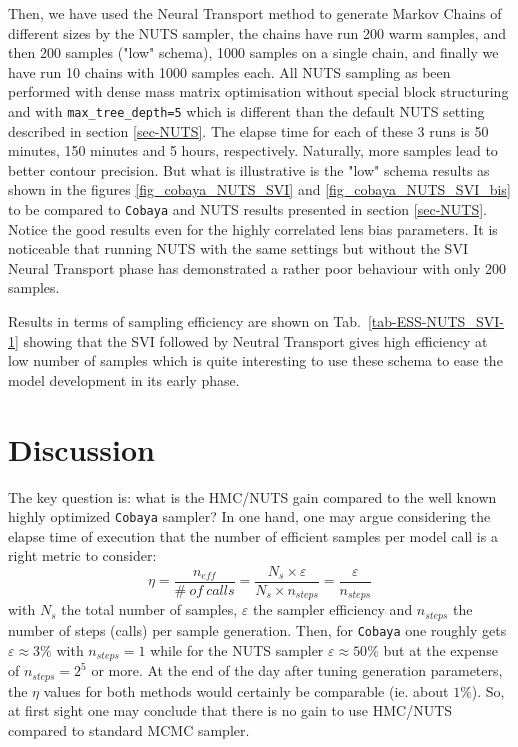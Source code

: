 \documentclass[twocolumn,twocolappendix,nofootinbib]{openjournal}
\begin{document}
Then, we have used the Neural Transport method to generate Markov Chains of different sizes by the NUTS sampler, the chains have run 200 warm samples, and then 200 samples ("low" schema), 1000 samples on a single chain, and finally we have run 10 chains  with 1000 samples each. All NUTS sampling as been performed with dense mass matrix optimisation without special block structuring and with \texttt{max\_tree\_depth=5} which is different than the default NUTS setting described in section \ref{sec-NUTS}. The elapse time for each of these 3 runs is 50 minutes, 150 minutes and 5 hours, respectively. Naturally, more samples lead to better contour precision. But what is illustrative is the "low" schema results as shown in the figures \ref{fig_cobaya_NUTS_SVI} and \ref{fig_cobaya_NUTS_SVI_bis}  to be compared to \texttt{Cobaya} and NUTS results presented in section \ref{sec-NUTS}. Notice the good results even for the highly correlated lens bias parameters. It is noticeable that running NUTS with the same settings  but without the SVI Neural Transport phase has demonstrated a rather poor behaviour with only 200 samples.  

Results in terms of sampling efficiency are shown on Tab.~\ref{tab-ESS-NUTS_SVI-1} showing that the SVI followed by Neutral Transport gives high efficiency at low number of samples which is quite interesting to use these schema to ease the model development in its early phase.
%
\section{Discussion}
\label{sec-discussion}
%
The key question is: what is the HMC/NUTS gain compared to the well known highly optimized \texttt{Cobaya} sampler? 
In one hand, one may argue considering the elapse time of execution that the number of efficient samples per model call is a right metric to consider: 
\begin{equation}
    \eta = \frac{n_{eff}}{\#\ of\ calls} = \frac{N_s \times \varepsilon}{N_s \times n_{steps}} = \frac{\varepsilon}{n_{steps}}
\end{equation}
with $N_s$ the total number of samples, $\varepsilon$ the sampler efficiency and $n_{steps}$ the number of steps (calls) per sample generation. Then, for \texttt{Cobaya} one roughly gets $\varepsilon\approx 3\%$ with $n_{steps}=1$ while for the NUTS sampler $\varepsilon\approx 50\%$ but at the expense of $n_{steps}=2^5$ or more. At the end of the day after tuning generation parameters, the $\eta$ values for both methods would certainly be comparable (ie. about $1\%$). So, at first sight one may conclude that there is no gain to use HMC/NUTS compared to standard MCMC sampler.  
\end{document}
